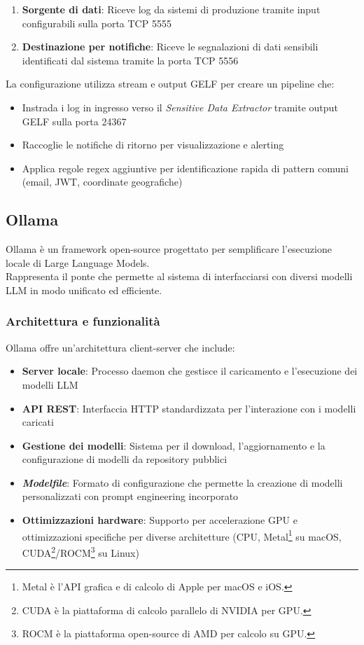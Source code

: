 \documentclass[12pt]{report}
\begin{document}
\begin{enumerate}
    \item \textbf{Sorgente di dati}: Riceve log da sistemi di produzione tramite input configurabili sulla porta TCP 5555
    \item \textbf{Destinazione per notifiche}: Riceve le segnalazioni di dati sensibili identificati dal sistema tramite la porta TCP 5556
\end{enumerate}

La configurazione utilizza stream e output GELF per creare un pipeline che:
\begin{itemize}
    \item Instrada i log in ingresso verso il \textit{Sensitive Data Extractor} tramite output GELF sulla porta 24367
    \item Raccoglie le notifiche di ritorno per visualizzazione e alerting
    \item Applica regole regex aggiuntive per identificazione rapida di pattern comuni (email, JWT, coordinate geografiche)
\end{itemize}

\subsection{Ollama}
\label{subsec:ollama}

Ollama è un framework open-source progettato per semplificare l'esecuzione locale di Large Language Models.\\
Rappresenta il ponte che permette al sistema di interfacciarsi con diversi modelli LLM in modo unificato ed efficiente.

\subsubsection{Architettura e funzionalità}
Ollama offre un'architettura client-server che include:

\begin{itemize}
    \item \textbf{Server locale}: Processo daemon che gestisce il caricamento e l'esecuzione dei modelli LLM
    \item \textbf{API REST}: Interfaccia HTTP standardizzata per l'interazione con i modelli caricati
    \item \textbf{Gestione dei modelli}: Sistema per il download, l'aggiornamento e la configurazione di modelli da repository pubblici
    \item \textit{\textbf{Modelfile}}: Formato di configurazione che permette la creazione di modelli personalizzati con prompt engineering incorporato
    \item \textbf{Ottimizzazioni hardware}: Supporto per accelerazione GPU e ottimizzazioni specifiche per diverse architetture (CPU, Metal\footnote{Metal è l'API grafica e di calcolo di Apple per macOS e iOS.} su macOS, CUDA\footnote{CUDA è la piattaforma di calcolo parallelo di NVIDIA per GPU.}/ROCM\footnote{ROCM è la piattaforma open-source di AMD per calcolo su GPU.} su Linux)
\end{itemize}
\end{document}
